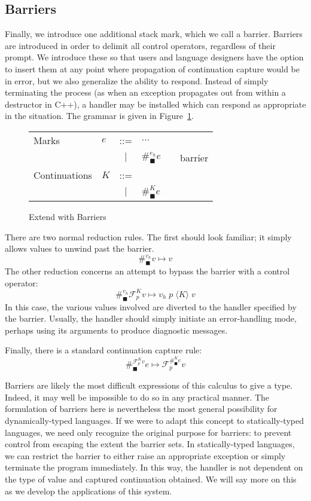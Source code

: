 \documentclass[11pt]{article}
\newcommand{\maybePage}{\newpage}
\newcommand\F{\mathcal{F}}
\newcommand{\angles}[1]{\langle#1\rangle}
\begin{document}
\maybePage
\subsection{Barriers}

Finally, we introduce one additional stack mark, which we call a barrier.
Barriers are introduced in order to delimit all control operators, regardless of their prompt.
We introduce these so that users and language designers have the option to insert them at any point where propagation of continuation capture would be in error, but we also generalize the ability to respond.
Instead of simply terminating the process (as when an exception propagates out from within a destructor in C++), a handler may be installed which can respond as appropriate in the situation.
The grammar is given in Figure~\ref{fig:addBarriers}.

\begin{figure}[H]
\caption{Extend with Barriers}
\label{fig:addBarriers}

\begin{tabular}{llclll}
Marks & $e$ & ::= & $\ldots$ &  \\
& & $|$ & $\#_\blacksquare^{e_h}e$ && barrier \\
Continuations & $K$ & ::= & \\
& & $|$ & $\#_{\blacksquare}^{K}e$ &&  \\
\end{tabular}
\end{figure}


There are two normal reduction rules.
The first should look familiar; it simply allows values to unwind past the barrier.
$$\#_\blacksquare^{v_h}v \mapsto v$$
The other reduction concerns an attempt to bypass the barrier with a control operator:
$$\#_\blacksquare^{v_h}\F_p^K v \mapsto v_h\;p\;\angles{K}\;v$$
In this case, the various values involved are diverted to the handler specified by the barrier.
Usually, the handler should simply initiate an error-handling mode, perhaps using its arguments to produce diagnostic messages.

Finally, there is a standard continuation capture rule:
$$\#_\blacksquare^{\F_p^K v}e \mapsto \F_p^{\#_\blacksquare^K e}v$$

Barriers are likely the most difficult expressions of this calculus to give a type.
Indeed, it may well be impossible to do so in any practical manner.
The formulation of barriers here is nevertheless the most general possibility for dynamically-typed languages.
If we were to adapt this concept to statically-typed languages, we need only recognize the original purpose for barriers: to prevent control from escaping the extent the barrier sets.
In statically-typed languages, we can restrict the barrier to either raise an appropriate exception or simply terminate the program immediately.
In this way, the handler is not dependent on the type of value and captured continuation obtained.
We will say more on this as we develop the applications of this system.
\end{document}

